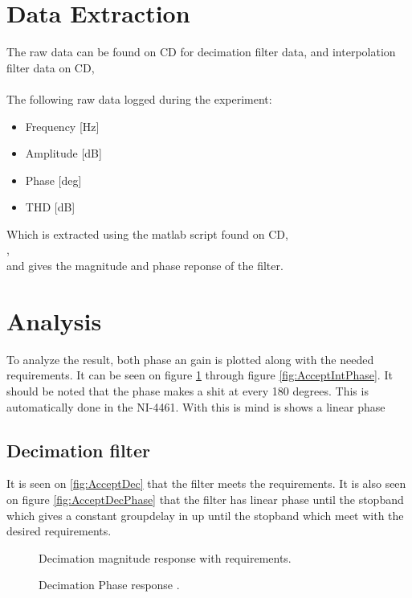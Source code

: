 \section{Data Extraction}
The raw data can be found on CD for decimation filter data, and interpolation filter data on CD, \\
   \\ 
The following raw data logged during the experiment:
\vspace{-5mm}
\begin{itemize}\addtolength{\itemsep}{-.35\baselineskip} 
\item Frequency [Hz]
\item Amplitude [dB]
\item Phase 	[deg]
\item THD 		[dB]
\end{itemize} 
Which is extracted using the matlab script found on CD, \\
,  \\
and gives the magnitude and phase reponse of the filter.
\section{Analysis}
To analyze the result, both phase an gain is plotted along with the needed requirements. It can be seen on figure \ref{fig:acceptDecMag} through figure \ref{fig:AcceptIntPhase}. It should be noted that the phase makes a shit at every 180 degrees. This is automatically done in the NI-4461. With this is mind is shows a linear phase

\subsection*{Decimation filter}
It is seen on \autoref{fig:AcceptDec} that the filter meets the requirements. It is also seen on figure \autoref{fig:AcceptDecPhase} that the filter has linear phase until the stopband which gives a constant groupdelay in up until the stopband which meet with the desired requirements. 
\begin{figure}[H]
	\centering
	
	\caption{Decimation magnitude response with requirements.}
	\label{fig:acceptDecMag}
\end{figure}
\begin{figure}[H]
	\centering
	
	\caption{Decimation Phase response .}
	\label{fig:AcceptDecPhase}
\end{figure}


